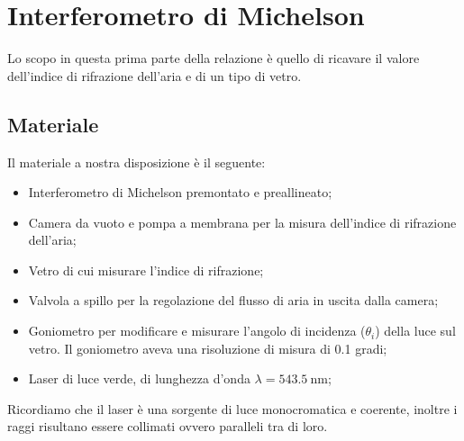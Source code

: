 \section{Interferometro di Michelson}

Lo scopo in questa prima parte della relazione è quello di ricavare il valore dell'indice di rifrazione dell'aria e di un tipo di vetro.

\subsection{Materiale}

Il materiale a nostra disposizione è il seguente:
\begin{itemize}
	\item{Interferometro di Michelson premontato e preallineato;}
    \item{Camera da vuoto e pompa a membrana per la misura dell'indice di rifrazione dell'aria;}
    \item{Vetro di cui misurare l'indice di rifrazione;}
	\item{Valvola a spillo per la regolazione del flusso di aria in uscita dalla camera;}
	\item{Goniometro per modificare e misurare l'angolo di incidenza ($\theta_i$) della luce sul vetro. Il goniometro aveva una risoluzione di misura di 0.1 gradi;}
    \item{Laser di luce verde, di lunghezza d'onda $\lambda = \SI{543.5}{\nano\metre}$;}
\end{itemize}
Ricordiamo che il laser è una sorgente di luce monocromatica e coerente, inoltre i raggi risultano essere collimati ovvero paralleli tra di loro.


